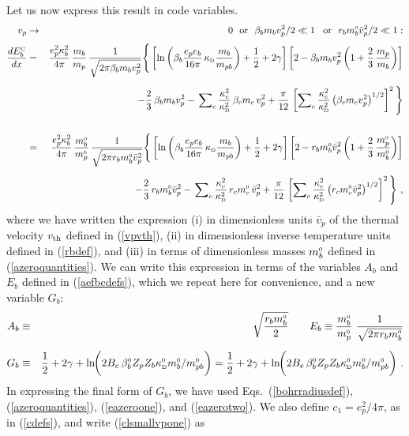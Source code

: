 \documentclass[preprint,12pt,eqsecnum,nofootinbib,amsmath,amssymb]{revtex4}
\newcommand{\smC}{{\rm\scriptscriptstyle C}}
\newcommand{\smD}{{\rm\scriptscriptstyle D}}
\newcommand{\smO}{{\rm\scriptscriptstyle 0}}
\begin{document}
\vskip0.5cm
\noindent
Let us now express this result in code variables.
\begin{eqnarray}
  v_p &\to& 0 ~~{\rm or}~~ \beta_b m_b v_p^2/2 \ll 1\,
  ~~{\rm or}~~ r_b m_b^\smO \bar v_p^2/2 \ll 1 :
\nonumber\\[3pt]
  {d E^\smC_b \over dx}  
  &=& 
  {e_p^2 \kappa_b^2 \over 4\pi} \, \frac{m_b}{m_p}\,
  {1 \over  \sqrt{2\pi \beta_b m_b v_p^2} }
  \Bigg\{
  \left[  \ln\left(\beta_b  { e_p e_b \over 16 \pi} \,
  \kappa_\smD { m_b \over m_{pb} } \right) + {1\over2} + 
  2\gamma \right] \left[2 - \beta_b m_b v_p^2\left(
  1 + \frac{2}{3}\, \frac{m_p}{m_b}\right)
  \right]
\nonumber\\[5pt]
  && - {2\over3} \, \beta_b m_b v_p^2 -
  \, {\sum}_c  \, { \kappa_c^2 \over
  \kappa_\smD^2 } \, \beta_c m_c \, v_p^2    
  + { \pi \over 12} \, \left[ {\sum}_c \, 
  {\kappa^2_c \over \kappa_\smD^2} 
 \left(\beta_c  m_c v_p^2\right)^{1/2} 
 \right]^2 \Bigg\} 
\\[15pt]
\label{clsmallvpone}
  &=&
  {e_p^2 \kappa_b^2 \over 4\pi} \, 
  \frac{m_b^\smO}{m_p^\smO}\,
  {1 \over  \sqrt{2\pi r_b m_b^\smO  \bar v_p^2} }
  \Bigg\{
  \left[  \ln\left(\beta_b  { e_p e_b \over 16 \pi} \,
  \kappa_\smD \frac{m_b}{m_{pb}} \right) + 
  \frac{1}{2} + 
  2\gamma \right] \left[2 - r_b m_b^\smO  \bar 
  v_p^2\left(
  1 + \frac{2}{3}\, \frac{m_p^\smO}{m_b^\smO}\right)
  \right]
\nonumber\\[5pt]
  && - {2\over3} \, r_b m_b^\smO \bar v_p^2 -
  \, {\sum}_c  \, { \kappa_c^2 \over
  \kappa_\smD^2 } \, r_c m_c^\smO \, \bar v_p^2    
  + { \pi \over 12} \, \left[ {\sum}_c \, 
  {\kappa^2_c \over \kappa_\smD^2} 
 \left(r _c  m_c^\smO \bar v_p^2\right)^{1/2} 
 \right]^2 \Bigg\} \ ,
\end{eqnarray}
where we have written the expression (i) in dimensionless
units $\bar v_p$ of the thermal velocity $v_{\rm th}$
defined in (\ref{vpvth}), (ii) in dimensionless inverse
temperature units defined in (\ref{rbdef}), and (iii) in
terms of dimensionless masses $m_b^\smO$ defined 
in (\ref{azeroquantities}). We can write this expression
in terms of the variables $A_b$ and $E_b$ defined in 
(\ref{aefbcdefs}), which we repeat here for convenience, 
and a new variable $G_b$:
\begin{eqnarray}
  A_b
  &\equiv&
  \sqrt{\frac{r_b m_b^\smO}{2}}
  ~~~~~~
  E_b
  \equiv  
  \frac{m_b^\smO}{m_p^\smO} ~
  \frac{1}{\sqrt{2\pi r_b m_b^\smO}}
\\[5pt]
  G_b
  &\equiv& 
  \frac{1}{2} + 2\gamma + \ln\hskip-0.1cm \bigg(
  2 B_e\, \beta_b^\smO Z_p Z_b \kappa_\smD^\smO 
  m_b^\smO/m_{pb}^\smO\bigg)
  =
  \frac{1}{2} + 2\gamma + \ln\hskip-0.1cm \bigg(
  2 B_e\, \beta_b^\smO Z_p Z_b \kappa_\smD^\smO 
  m_b^\smO/m_{pb}^\smO\bigg) \ .
\end{eqnarray}
In expressing the final form of $G_b$, we have used 
Eqs.~(\ref{bohrradiusdef}), (\ref{azeroquantities}),
(\ref{eazeroone}), and (\ref{eazerotwo}). We also
define $c_1 = e_p^2/4\pi$, as in (\ref{cdefs}), and
write (\ref{clsmallvpone}) as 
\end{document}
